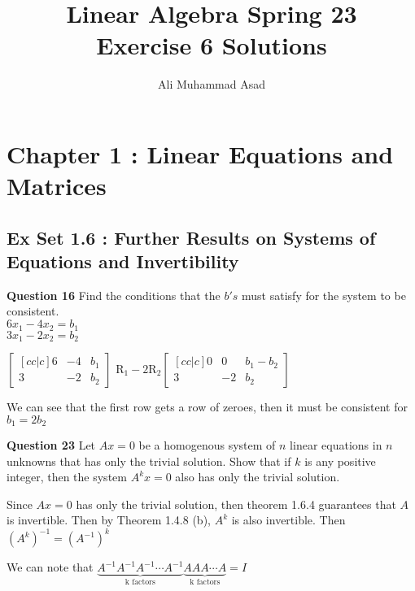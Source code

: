 \documentclass[addpoints]{exam}
\title{Linear Algebra Spring 23\\ Exercise 6 Solutions}
\author{Ali Muhammad Asad}
\begin{document}
\maketitle
\begin{sloppypar}
\section*{\textbf{Chapter 1 : Linear Equations and Matrices}}
\subsection*{\textbf{Ex Set 1.6 : Further Results on Systems of Equations and Invertibility}}
\begin{questions}
    \question
    \textbf{Question 16} 
    Find the conditions that the $b's$ must satisfy for the system to be consistent. \\ 
    $ 6x_1 - 4x_2 = b_1 $ \\ $ 3x_1 - 2x_2 = b_2 $
    \begin{solution}
        $ \begin{bmatrix}[cc|c]
            6 & -4 & b_1 \\ 3 & -2 & b_2           
        \end{bmatrix} $ \hspace*{5mm} R$_1 - 2$R$_2 \begin{bmatrix}[cc|c]
            0 & 0 & b_1 - b_2 \\ 3 & -2 & b_2            
        \end{bmatrix}$ 

        We can see that the first row gets a row of zeroes, then it must be consistent for $ b_1 = 2b_2 $
    \end{solution}

    \question
    \textbf{Question 23}
    Let $ Ax = 0 $ be a homogenous system of $n$ linear equations in $n$ unknowns that has only the trivial solution. Show that if $k$ is any positive integer, then the system $ A^k x = 0 $ also has only the trivial solution.
    \begin{solution}
        
        Since $ Ax = 0 $ has only the trivial solution, then theorem 1.6.4 guarantees that $A$ is invertible. Then by Theorem 1.4.8 (b), $ A^k $ is also invertible. Then $ (A^k)^{-1} = (A^{-1})^k $

        We can note that $ \underbrace{A^{-1}A^{-1}A^{-1} \cdots A^{-1}}_\text{k factors} \underbrace{AAA\cdots A}_\text{k factors} = I$ 


\end{solution}
\end{questions}
\end{sloppypar}
\end{document}
